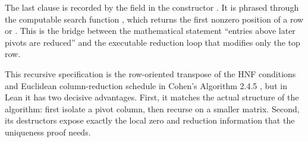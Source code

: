 The last clause is recorded by the field  in the constructor
. It is phrased through the computable search function
, which returns the first nonzero position of a row or
. This is the bridge between the mathematical statement ``entries
above later pivots are reduced'' and the executable reduction loop that modifies
only the top row.

This recursive specification is the row-oriented transpose of the HNF
conditions and Euclidean column-reduction schedule in Cohen's Algorithm 2.4.5
\citep[pp. 68--69]{cohen1993}, but in Lean it has two
decisive advantages. First, it matches the actual structure of the algorithm:
first isolate a pivot column, then recurse on a smaller matrix. Second, its
destructors expose exactly the local zero and reduction information that the
uniqueness proof needs.
